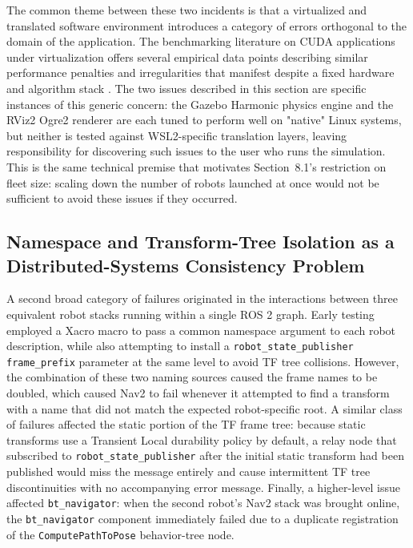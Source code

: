 The common theme between these two incidents is that a virtualized and translated software environment introduces a category of errors orthogonal to the domain of the application. The benchmarking literature on CUDA applications under virtualization offers several empirical data points describing similar performance penalties and irregularities that manifest despite a fixed hardware and algorithm stack \cite{belkhiri2024analyzing}. The two issues described in this section are specific instances of this generic concern: the Gazebo Harmonic physics engine and the RViz2 Ogre2 renderer are each tuned to perform well on "native" Linux systems, but neither is tested against WSL2-specific translation layers, leaving responsibility for discovering such issues to the user who runs the simulation. This is the same technical premise that motivates Section~8.1's restriction on fleet size: scaling down the number of robots launched at once would not be sufficient to avoid these issues if they occurred.

\subsection{Namespace and Transform-Tree Isolation as a Distributed-Systems Consistency Problem}

A second broad category of failures originated in the interactions between three equivalent robot stacks running within a single ROS 2 graph. Early testing employed a Xacro macro to pass a common namespace argument to each robot description, while also attempting to install a \texttt{robot\_state\_publisher} \texttt{frame\_prefix} parameter at the same level to avoid TF tree collisions. However, the combination of these two naming sources caused the frame names to be doubled, which caused Nav2 to fail whenever it attempted to find a transform with a name that did not match the expected robot-specific root. A similar class of failures affected the static portion of the TF frame tree: because static transforms use a Transient Local durability policy by default, a relay node that subscribed to \texttt{robot\_state\_publisher} after the initial static transform had been published would miss the message entirely and cause intermittent TF tree discontinuities with no accompanying error message. Finally, a higher-level issue affected \texttt{bt\_navigator}: when the second robot's Nav2 stack was brought online, the \texttt{bt\_navigator} component immediately failed due to a duplicate registration of the \texttt{ComputePathToPose} behavior-tree node.

